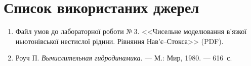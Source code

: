 \documentclass[14pt,a4paper,extarticle]{extarticle}
\begin{document}
\section*{Список використаних джерел}

\begin{enumerate}
  \item Файл умов до лабораторної роботи №\,3.
  <<Чисельне моделювання в'язкої ньютонівської нестислої рідини.
  Рівняння Нав'є--Стокса>> (PDF).
  \item Роуч П.
  \emph{Вычислительная гидродинамика}. ---
  М.: Мир, 1980. --- 616~с.
\end{enumerate}
\end{document}
